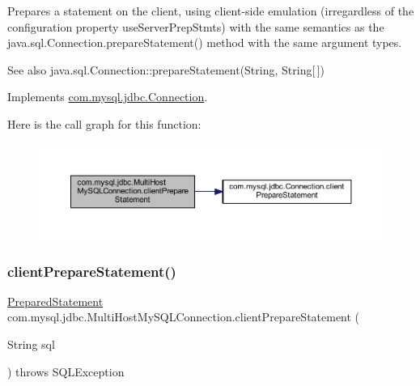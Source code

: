 Prepares a statement on the client, using client-\/side emulation (irregardless of the configuration property \textquotesingle{}use\+Server\+Prep\+Stmts\textquotesingle{}) with the same semantics as the java.\+sql.\+Connection.\+prepare\+Statement() method with the same argument types.

\begin{DoxySeeAlso}{See also}
java.\+sql.\+Connection\+::prepare\+Statement(\+String, String\mbox{[}$\,$\mbox{]}) 
\end{DoxySeeAlso}


Implements \mbox{\hyperlink{interfacecom_1_1mysql_1_1jdbc_1_1_connection_a452a8703aca3c45fdafe3e1a5093b8b5}{com.\+mysql.\+jdbc.\+Connection}}.

Here is the call graph for this function\+:
\nopagebreak
\begin{figure}[H]
\begin{center}
\leavevmode
\includegraphics[width=350pt]{classcom_1_1mysql_1_1jdbc_1_1_multi_host_my_s_q_l_connection_aa9841555ae046be40f86ba4a2e4f79ed_cgraph}
\end{center}
\end{figure}
\mbox{\label{classcom_1_1mysql_1_1jdbc_1_1_multi_host_my_s_q_l_connection_af9777071bc7848bd47f094d8ff57d54d}} 
\subsubsection{\texorpdfstring{client\+Prepare\+Statement()}{clientPrepareStatement()}\hspace{0.1cm}{\footnotesize\ttfamily [6/6]}}
{\footnotesize\ttfamily \mbox{\hyperlink{classcom_1_1mysql_1_1jdbc_1_1_prepared_statement}{Prepared\+Statement}} com.\+mysql.\+jdbc.\+Multi\+Host\+My\+S\+Q\+L\+Connection.\+client\+Prepare\+Statement (\begin{DoxyParamCaption}\item[{String}]{sql }\end{DoxyParamCaption}) throws S\+Q\+L\+Exception}


